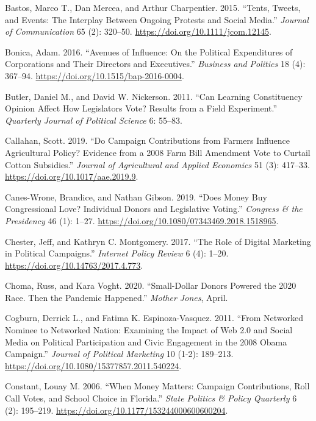 \documentclass[12pt,]{article}
\begin{document}
\leavevmode\hypertarget{ref-bastos2015}{}%
Bastos, Marco T., Dan Mercea, and Arthur Charpentier. 2015. ``Tents,
Tweets, and Events: The Interplay Between Ongoing Protests and Social
Media.'' \emph{Journal of Communication} 65 (2): 320--50.
\url{https://doi.org/10.1111/jcom.12145}.

\leavevmode\hypertarget{ref-bonica2016}{}%
Bonica, Adam. 2016. ``Avenues of Influence: On the Political
Expenditures of Corporations and Their Directors and Executives.''
\emph{Business and Politics} 18 (4): 367--94.
\url{https://doi.org/10.1515/bap-2016-0004}.

\leavevmode\hypertarget{ref-butler2011}{}%
Butler, Daniel M., and David W. Nickerson. 2011. ``Can Learning
Constituency Opinion Affect How Legislators Vote? Results from a Field
Experiment.'' \emph{Quarterly Journal of Political Science} 6: 55--83.

\leavevmode\hypertarget{ref-callahan2019}{}%
Callahan, Scott. 2019. ``Do Campaign Contributions from Farmers
Influence Agricultural Policy? Evidence from a 2008 Farm Bill Amendment
Vote to Curtail Cotton Subsidies.'' \emph{Journal of Agricultural and
Applied Economics} 51 (3): 417--33.
\url{https://doi.org/10.1017/aae.2019.9}.

\leavevmode\hypertarget{ref-caneswrone2019}{}%
Canes-Wrone, Brandice, and Nathan Gibson. 2019. ``Does Money Buy
Congressional Love? Individual Donors and Legislative Voting.''
\emph{Congress \& the Presidency} 46 (1): 1--27.
\url{https://doi.org/10.1080/07343469.2018.1518965}.

\leavevmode\hypertarget{ref-chester2017}{}%
Chester, Jeff, and Kathryn C. Montgomery. 2017. ``The Role of Digital
Marketing in Political Campaigns.'' \emph{Internet Policy Review} 6 (4):
1--20. \url{https://doi.org/10.14763/2017.4.773}.

\leavevmode\hypertarget{ref-choma2020}{}%
Choma, Russ, and Kara Voght. 2020. ``Small-Dollar Donors Powered the
2020 Race. Then the Pandemic Happened.'' \emph{Mother Jones}, April.

\leavevmode\hypertarget{ref-cogburn2011}{}%
Cogburn, Derrick L., and Fatima K. Espinoza-Vasquez. 2011. ``From
Networked Nominee to Networked Nation: Examining the Impact of Web 2.0
and Social Media on Political Participation and Civic Engagement in the
2008 Obama Campaign.'' \emph{Journal of Political Marketing} 10 (1-2):
189--213. \url{https://doi.org/10.1080/15377857.2011.540224}.

\leavevmode\hypertarget{ref-constant2006}{}%
Constant, Louay M. 2006. ``When Money Matters: Campaign Contributions,
Roll Call Votes, and School Choice in Florida.'' \emph{State Politics \&
Policy Quarterly} 6 (2): 195--219.
\url{https://doi.org/10.1177/153244000600600204}.
\end{document}
